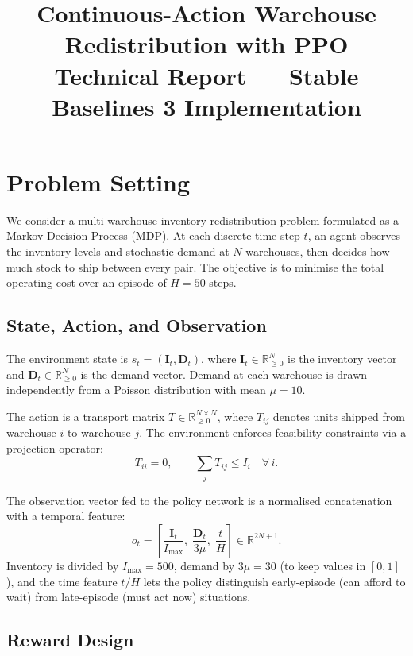 \documentclass[11pt]{article}
\title{Continuous-Action Warehouse Redistribution with PPO\\[4pt]
\large Technical Report — Stable Baselines 3 Implementation}
\author{}
\date{}
\begin{document}
\maketitle

\section{Problem Setting}

We consider a multi-warehouse inventory redistribution problem formulated as a Markov Decision Process (MDP). At each discrete time step $t$, an agent observes the inventory levels and stochastic demand at $N$ warehouses, then decides how much stock to ship between every pair. The objective is to minimise the total operating cost over an episode of $H=50$ steps.

\subsection{State, Action, and Observation}

The environment state is $s_t = (\mathbf{I}_t, \mathbf{D}_t)$, where $\mathbf{I}_t \in \mathbb{R}^N_{\geq 0}$ is the inventory vector and $\mathbf{D}_t \in \mathbb{R}^N_{\geq 0}$ is the demand vector. Demand at each warehouse is drawn independently from a Poisson distribution with mean $\mu = 10$.

The action is a transport matrix $T \in \mathbb{R}^{N \times N}_{\geq 0}$, where $T_{ij}$ denotes units shipped from warehouse $i$ to warehouse $j$. The environment enforces feasibility constraints via a projection operator:
\begin{equation}
    T_{ii} = 0, \qquad \sum_j T_{ij} \leq I_i \quad \forall\, i.
\end{equation}

The observation vector fed to the policy network is a normalised concatenation with a temporal feature:
\[
    o_t = \left[\frac{\mathbf{I}_t}{I_{\max}},\;\frac{\mathbf{D}_t}{3\mu},\;\frac{t}{H}\right] \in \mathbb{R}^{2N+1}.
\]
Inventory is divided by $I_{\max}=500$, demand by $3\mu=30$ (to keep values in $[0,1]$), and the time feature $t/H$ lets the policy distinguish early-episode (can afford to wait) from late-episode (must act now) situations.

\subsection{Reward Design}
\end{document}

